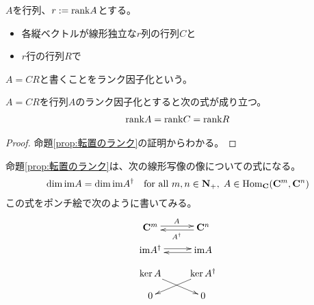 	\begin{definition}
	\label{def:ランク因子化} %
		$A$を行列、$r:={\operatorname{rank}} A$とする。
		\begin{itemize}\setlength{\itemsep}{-1mm} %
			\item 各縦ベクトルが線形独立な$r$列の行列$C$と
			\item $r$行の行列$R$で
		\end{itemize} %
		$A=CR$と書くことをランク因子化という。
	\end{definition} %

	\begin{proposition}[ランク因子化]\label{prop:ランク因子化} %
		$A=CR$を行列$A$のランク因子化とすると次の式が成り立つ。
		\begin{equation*}\begin{split} %
			\rank A = \rank C = \rank R
		\end{split}\end{equation*} %
	\end{proposition} %
	\begin{proof} %
		命題\ref{prop:転置のランク}の証明からわかる。
	\end{proof} %

	命題\ref{prop:転置のランク}は、次の線形写像の像についての式になる。
	\begin{equation*}\begin{split}
		\dim{\ensuremath{\operatorname{im}}} A = \dim{\ensuremath{\operatorname{im}}} A^\dag
		\quad\text{for all }m,n\in\mathbf{N}_+,\;A\in{\ensuremath{\operatorname{Hom}}}_{\mathbf{C}}(\mathbf{C}^m,\mathbf{C}^n)
	\end{split}\end{equation*}
	この式をポンチ絵で次のように書いてみる。
	\begin{equation*}\xymatrix@R=1em{
		\fukuso^m \ar@<2pt>[r]^A & \fukuso^n \ar@<2pt>[l]^{A^\dag} \\
		\im A^\dag \ar@<2pt>[r] & \im A \ar@<2pt>[l] \\
		\ker A \ar[rd] & \ker A^\dag \ar[ld] \\
		0 & 0 \\
	}\end{equation*}
\endgroup %

